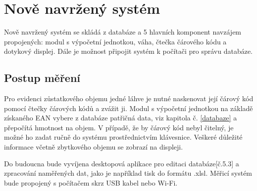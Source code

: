 \chapter{Nově navržený systém}
\label{Nově navržený systém}
Nově navržený systém se skládá z databáze a 5 hlavních komponent navzájem propojených: modul s výpočetní jednotkou, váha, čtečka čárového kódu a dotykový displej. Dále je možnost připojit systém k počítači pro správu databáze. 

\section{Postup měření}%
Pro evidenci zůstatkového objemu jedné láhve je nutné naskenovat její čárový kód pomocí čtečky čárových kódů a zvážit ji. Modul s výpočetní jednotkou na základě získaného EAN vybere z databáze patřičná data, viz kapitola č. \ref{databaze} a přepočítá hmotnost na objem. V případě, že by čárový kód nebyl čitelný, je možné ho zadat ručně do systému prostřednictvím klávesnice. Veškeré důležité informace včetně zbytkového objemu se zobrazí na displeji. %

Do budoucna bude vyvíjena desktopová aplikace pro editaci databáze[č.5.3] a zpracování naměřených dat, jako je například tisk do formátu .xlsl. Měřicí systém bude propojený s počítačem skrz USB kabel nebo Wi-Fi.

